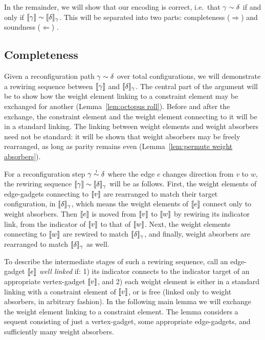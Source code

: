 \documentclass{lmcs}
\begin{document}
%


In the remainder, we will show that our encoding is correct, i.e.\ that $\gamma\perm\delta$ if and only if $\itn\gamma\perm\itn\delta_\gamma$.
%
This will be separated into two parts: completeness ($\Rightarrow$) and soundness ($\Leftarrow$) .






\subsection*{Completeness}



Given a reconfiguration path $\gamma\perm\delta$ over total configurations, we will demonstrate a rewiring sequence between $\llbracket\gamma\rrbracket$ and $\llbracket\delta\rrbracket_\gamma$.
%
The central part of the argument will be to show how the weight element linking to a constraint element may be exchanged for another (Lemma~\ref{lem:octopus roll}).
%
Before and after the exchange, the constraint element and the weight element connecting to it will be in a standard linking.
%
The linking between weight elements and weight absorbers need not be standard: it will be shown that weight absorbers may be freely rearranged, as long as parity remains even (Lemma~\ref{lem:permute weight absorbers}).



For a reconfiguration step $\gamma\perm*\delta$ where the edge $e$ changes direction from $v$ to $w$, the rewiring sequence $\itn\gamma\perm\itn\delta_\gamma$ will be as follows.
%
First, the weight elements of edge-gadgets connecting to $\llbracket v\rrbracket$ are rearranged to match their target configuration, in $\llbracket\delta\rrbracket_\gamma$, which means the weight elements of $\llbracket e\rrbracket$ connect only to weight absorbers.
%
Then $\llbracket e\rrbracket$ is moved from $\llbracket v\rrbracket$ to $\llbracket w\rrbracket$ by rewiring its indicator link, from the indicator of $\llbracket v\rrbracket$ to that of $\llbracket w\rrbracket$.
%
Next, the weight elements connecting to $\llbracket w\rrbracket$ are rewired to match $\llbracket\delta\rrbracket_\gamma$, and finally, weight absorbers are rearranged to match $\llbracket\delta\rrbracket_\gamma$ as well.



To describe the intermediate stages of such a rewiring sequence, call an edge-gadget $\llbracket e\rrbracket$ \emph{well linked} if: 1) its indicator connects to the indicator target of an appropriate vertex-gadget $\llbracket v\rrbracket$, and 2) each weight element is either in a standard linking with a constraint element of $\llbracket v\rrbracket$, or is free (linked only to weight absorbers, in arbitrary fashion). In the following main lemma we will exchange the weight element linking to a constraint element. The lemma considers a sequent consisting of just a vertex-gadget, some appropriate edge-gadgets, and sufficiently many weight absorbers.
\end{document}
